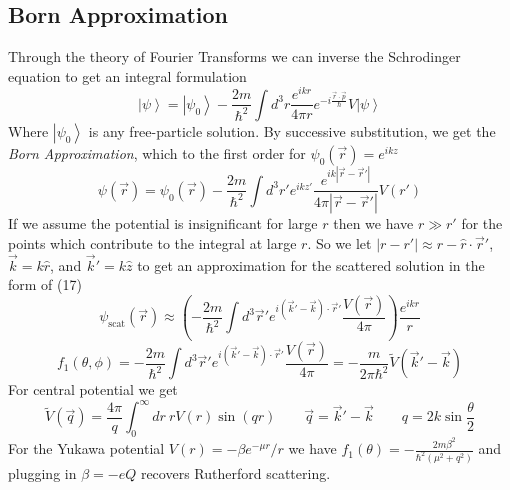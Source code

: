 \documentclass{article}
\newcommand{\ket}[1]{\left|#1\right\rangle}
\begin{document}
\subsection{Born Approximation}
Through the theory of Fourier Transforms we can inverse the Schrodinger equation to get an integral formulation
$$\ket{\psi} = \ket{\psi_0} - \frac{2m}{\hbar^2}\int d^3r \frac{e^{ikr}}{4\pi r} e^{-i\frac{\vec{r}\cdot \vec{p}}{\hbar}}V\ket{\psi}$$
Where $\ket{\psi_0}$ is any free-particle solution. By successive substitution, we get the \emph{Born Approximation}, which to the first order for $\psi_0(\vec r) = e^{ikz}$
$$\boxed{\psi(\vec r) =\psi_0(\vec r) -\frac{2m}{\hbar^2}\int d^3r' e^{ikz'} \frac{e^{ik|\vec r-\vec r'|}}{4\pi |\vec r - \vec r'|}V(r')}$$
If we assume the potential is insignificant for large $r$ then we have $r\gg r'$ for the points which contribute to the integral at large $r$. So we let $|r-r'|\approx r-\hat r \cdot \vec r'$, $\vec k = k\hat r$, and $\vec k' =k\hat z$ to get an approximation for the scattered solution in the form of (17)
$$\psi_{\text{scat}} (\vec r) \approx \left(-\frac{2m}{\hbar^2}\int d^3 \vec r' e^{i(\vec k' - \vec k)\cdot \vec r'}\frac{V(\vec r)}{4\pi}\right)\frac{e^{ikr}}{r}$$ 
$$f_1(\theta, \phi) = -\frac{2m}{\hbar^2}\int d^3 \vec r' e^{i(\vec k' - \vec k)\cdot \vec r'}\frac{V(\vec r)}{4\pi} = -\frac{m}{2\pi \hbar^2} \widetilde{V}(\vec k'- 	\vec k)$$
For central potential we get
$$\widetilde{V} (\vec q) = \frac{4\pi}{q} \int_0^{\infty} dr\  rV(r) \sin(qr)\qquad \vec q = \vec k' -\vec k \qquad q =2k\sin\frac{\theta}{2}$$
For the Yukawa potential $V(r)= -\beta e^{-\mu r}/r$ we have $f_1(\theta) = -\frac{2m\beta^2}{\hbar^2(\mu^2+q^2)}$ and plugging in $\beta = -eQ$ recovers Rutherford scattering. 
\end{document}
